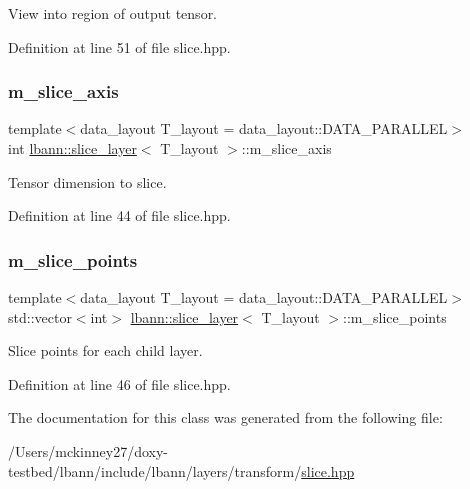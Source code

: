 View into region of output tensor. 

Definition at line 51 of file slice.\+hpp.

\mbox{\label{classlbann_1_1slice__layer_a349dcd71f67d77d40247da24e4641ea2}} 
\subsubsection{\texorpdfstring{m\+\_\+slice\+\_\+axis}{m\_slice\_axis}}
{\footnotesize\ttfamily template$<$data\+\_\+layout T\+\_\+layout = data\+\_\+layout\+::\+D\+A\+T\+A\+\_\+\+P\+A\+R\+A\+L\+L\+EL$>$ \\
int \hyperlink{classlbann_1_1slice__layer}{lbann\+::slice\+\_\+layer}$<$ T\+\_\+layout $>$\+::m\+\_\+slice\+\_\+axis\hspace{0.3cm}{\ttfamily [private]}}

Tensor dimension to slice. 

Definition at line 44 of file slice.\+hpp.

\mbox{\label{classlbann_1_1slice__layer_af79dab13a70da2e81209e7ae15166e30}} 
\subsubsection{\texorpdfstring{m\+\_\+slice\+\_\+points}{m\_slice\_points}}
{\footnotesize\ttfamily template$<$data\+\_\+layout T\+\_\+layout = data\+\_\+layout\+::\+D\+A\+T\+A\+\_\+\+P\+A\+R\+A\+L\+L\+EL$>$ \\
std\+::vector$<$int$>$ \hyperlink{classlbann_1_1slice__layer}{lbann\+::slice\+\_\+layer}$<$ T\+\_\+layout $>$\+::m\+\_\+slice\+\_\+points\hspace{0.3cm}{\ttfamily [private]}}

Slice points for each child layer. 

Definition at line 46 of file slice.\+hpp.



The documentation for this class was generated from the following file\+:\begin{DoxyCompactItemize}
\item 
/\+Users/mckinney27/doxy-\/testbed/lbann/include/lbann/layers/transform/\hyperlink{slice_8hpp}{slice.\+hpp}\end{DoxyCompactItemize}
